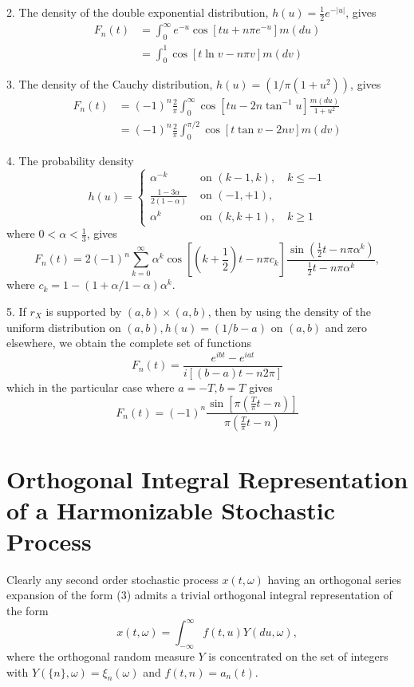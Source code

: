 \documentclass{article}
\begin{document}
2. The density of the double exponential distribution, $h(u)=\frac{1}{2} e^{-|u|}$, gives
\[
\begin{aligned}
F_{n}(t) &=\int_{0}^{\infty} e^{-u} \cos \left[t u+n \pi e^{-u}\right] m(d u) \\
&=\int_{0}^{1} \cos [t \ln v-n \pi v] m(d v)
\end{aligned}
\]

3. The density of the Cauchy distribution, $h(u)=(1 / \pi(1+u^{2}))$, gives
\[
\begin{aligned}
F_{n}(t) &=(-1)^{n} \frac{2}{\pi} \int_{0}^{\infty} \cos \left[t u-2 n \tan^{-1} u\right] \frac{m(d u)}{1+u^{2}} \\
&=(-1)^{n} \frac{2}{\pi} \int_{0}^{\pi / 2} \cos [t \tan v-2 n v] m(d v)
\end{aligned}
\]

4. The probability density
\[
h(u)= \begin{cases}
\alpha^{-k} & \text{ on } (k-1, k), \quad k \leqslant-1 \\
\frac{1-3 \alpha}{2(1-\alpha)} & \text{ on } (-1,+1), \\
\alpha^{k} & \text{ on } (k, k+1), \quad k \geqslant 1
\end{cases}
\]
where $0<\alpha<\frac{1}{3}$, gives
\[
F_{n}(t)=2(-1)^{n} \sum_{k=0}^{\infty} \alpha^{k} \cos \left[\left(k+\frac{1}{2}\right) t-n \pi c_{k}\right] \frac{\sin \left(\frac{1}{2} t-n \pi \alpha^{k}\right)}{\frac{1}{2} t-n \pi \alpha^{k}},
\]
where $c_{k}=1-(1+\alpha / 1-\alpha) \alpha^{k}$.

5. If $r_{X}$ is supported by $(a, b) \times(a, b)$, then by using the density of the uniform distribution on $(a, b), h(u)=(1 / b-a)$ on $(a, b)$ and zero elsewhere, we obtain the complete set of functions
\[
F_{n}(t)=\frac{e^{i b t}-e^{i a t}}{i[(b-a) t-n 2 \pi]}
\]
which in the particular case where $a=-T, b=T$ gives
\[
F_{n}(t)=(-1)^{n} \frac{\sin \left[\pi\left(\frac{T}{\pi} t-n\right)\right]}{\pi\left(\frac{T}{\pi} t-n\right)}
\]

\section*{Orthogonal Integral Representation of a Harmonizable Stochastic Process}

Clearly any second order stochastic process $x(t, \omega)$ having an orthogonal series expansion of the form (3) admits a trivial orthogonal integral representation of the form
\[
x(t, \omega)=\int_{-\infty}^{\infty} f(t, u) Y(d u, \omega),
\]
where the orthogonal random measure $Y$ is concentrated on the set of integers with $Y(\{n\}, \omega)=\xi_{n}(\omega)$ and $f(t, n)=a_{n}(t)$.
\end{document}
